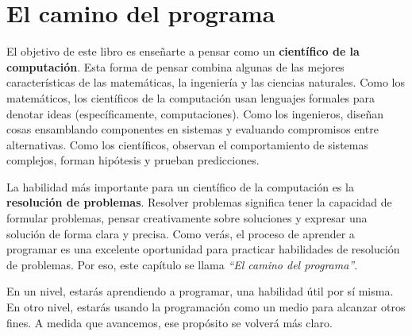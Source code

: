 
\chapter{El camino del programa}

El objetivo de este libro es enseñarte a pensar como un \textbf{científico de la computación}. Esta forma de pensar combina algunas de las mejores características de las matemáticas, la ingeniería y las ciencias naturales. Como los matemáticos, los científicos de la computación usan lenguajes formales para denotar ideas (específicamente, computaciones). 
Como los ingenieros, diseñan cosas ensamblando componentes en sistemas y evaluando compromisos entre alternativas. Como los científicos, observan el comportamiento de sistemas complejos, forman hipótesis y prueban predicciones.

La habilidad más importante para un científico de la computación es la \textbf{resolución de problemas}. Resolver problemas significa tener la capacidad de formular problemas, pensar creativamente sobre soluciones y expresar una solución de forma clara y precisa. Como verás, el proceso de aprender a programar es una excelente oportunidad para practicar habilidades de resolución de problemas. Por eso, este capítulo se llama \emph{“El camino del programa”}.

En un nivel, estarás aprendiendo a programar, una habilidad útil por sí misma. En otro nivel, estarás usando la programación como un medio para alcanzar otros fines. A medida que avancemos, ese propósito se volverá más claro.


